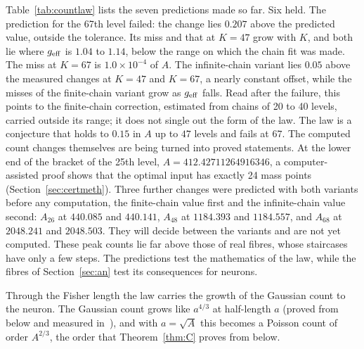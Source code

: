 Table~\ref{tab:countlaw} lists the seven predictions made so far. Six held. The prediction for the 67th level failed: the
change lies $0.207$ above the predicted value, outside the tolerance. Its miss and that at $K=47$ grow with $K$, and both lie where
$g_{\rm eff}$ is $1.04$ to $1.14$, below the range on which the chain fit was made. The miss at $K=67$ is $1.0\times10^{-4}$ of $A$.
The infinite-chain variant lies $0.05$ above the measured changes at $K=47$ and $K=67$, a nearly constant offset, while the misses of the finite-chain
variant grow as $g_{\rm eff}$ falls. Read after the failure, this points to the finite-chain correction, estimated from chains of 20 to 40
levels, carried outside its range; it does not single out the form of the law. The law is a conjecture that holds to $0.15$ in $A$
up to $47$ levels and fails at $67$. The computed count changes themselves are being turned into proved statements. At the lower
end of the bracket of the 25th level, $A=412.42711264916346$, a computer-assisted proof shows that the optimal
input has exactly 24 mass points (Section~\ref{sec:certmeth}). Three further
changes were predicted with both variants before any computation, the finite-chain value first and the infinite-chain value second:
$A_{26}$ at $440.085$ and $440.141$, $A_{48}$ at $1184.393$ and
$1184.557$, and $A_{68}$ at $2048.241$ and $2048.503$. They will decide between the variants and are not yet computed. These peak counts lie far above those of real fibres, whose
staircases have only a few steps. The predictions test the mathematics of the law, while the fibres of Section~\ref{sec:an} test its
consequences for neurons.

Through the Fisher length the law carries the growth of the Gaussian count to the neuron. The Gaussian count grows like $a^{4/3}$ at
half-length $a$ (proved from below and measured in~\cite{Paper1}), and with $a=\sqrt A$ this becomes a Poisson count of order $A^{2/3}$, the order that Theorem~\ref{thm:C} proves from below.
